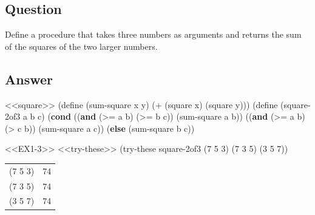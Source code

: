 \documentclass[
]{article}
\newenvironment{Shaded}{}{}
\newcommand{\DecValTok}[1]{\textcolor[rgb]{0.25,0.63,0.44}{#1}}
\newcommand{\ExtensionTok}[1]{#1}
\newcommand{\FunctionTok}[1]{\textcolor[rgb]{0.02,0.16,0.49}{#1}}
\newcommand{\KeywordTok}[1]{\textcolor[rgb]{0.00,0.44,0.13}{\textbf{#1}}}
\newcommand{\NormalTok}[1]{#1}
\newcommand{\OperatorTok}[1]{\textcolor[rgb]{0.40,0.40,0.40}{#1}}
\begin{document}
\hypertarget{question-2}{%
\subsection{Question}\label{question-2}}

Define a procedure that takes three numbers as arguments and returns the
sum of the squares of the two larger numbers.

\hypertarget{answer-2}{%
\subsection{Answer}\label{answer-2}}

\hypertarget{EX1-3}{%
\label{EX1-3}}%
\begin{Shaded}
\begin{Highlighting}[numbers=left,,]
\NormalTok{\textless{}\textless{}square\textgreater{}\textgreater{}}
\NormalTok{(}\ExtensionTok{define}\FunctionTok{ }\NormalTok{(sum{-}square x y)}
\NormalTok{  (}\OperatorTok{+}\NormalTok{ (square x) (square y)))}
\NormalTok{(}\ExtensionTok{define}\FunctionTok{ }\NormalTok{(square{-}2of3 a b c)}
\NormalTok{  (}\KeywordTok{cond}\NormalTok{ ((}\KeywordTok{and}\NormalTok{ (}\OperatorTok{\textgreater{}=}\NormalTok{ a b) (}\OperatorTok{\textgreater{}=}\NormalTok{ b c)) (sum{-}square a b))}
\NormalTok{        ((}\KeywordTok{and}\NormalTok{ (}\OperatorTok{\textgreater{}=}\NormalTok{ a b) (}\OperatorTok{\textgreater{}}\NormalTok{ c b)) (sum{-}square a c))}
\NormalTok{        (}\KeywordTok{else}\NormalTok{ (sum{-}square b c))}
\end{Highlighting}
\end{Shaded}

\begin{Shaded}
\begin{Highlighting}[numbers=left,,]
\NormalTok{\textless{}\textless{}EX1{-}3\textgreater{}\textgreater{}}
\NormalTok{\textless{}\textless{}try{-}these\textgreater{}\textgreater{}}
\NormalTok{ (try{-}these square{-}2of3 \textquotesingle{}(}\DecValTok{7} \DecValTok{5} \DecValTok{3}\NormalTok{)}
\NormalTok{                        \textquotesingle{}(}\DecValTok{7} \DecValTok{3} \DecValTok{5}\NormalTok{)}
\NormalTok{                        \textquotesingle{}(}\DecValTok{3} \DecValTok{5} \DecValTok{7}\NormalTok{))}
\end{Highlighting}
\end{Shaded}

\begin{longtable}[]{@{}ll@{}}
\toprule
\endhead
(7 5 3) & 74 \\
(7 3 5) & 74 \\
(3 5 7) & 74 \\
\bottomrule
\end{longtable}
\end{document}
